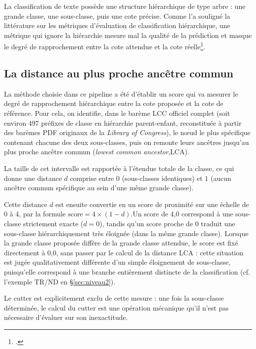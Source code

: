 La classification de texte possède une structure hiérarchique de type arbre : une grande classe, une sous-classe, puis une cote précise. Comme l'a souligné la littérature sur les métriques d'évaluation de classification hiérarchique, une métrique qui ignore la hiérarchie mesure mal la qualité de la prédiction et masque le degré de rapprochement entre la cote attendue et la cote réelle\footcite{kosmopoulos2015,kiritchenko2006}.



\subsection{La distance au plus proche ancêtre commun}
\label{sec:distance-lca}

La méthode choisie dans ce pipeline a été d'établir un score qui va mesurer le degré de rapprochement hiérarchique entre la cote proposée et la cote de référence. Pour cela, on identifie, dans le barème LCC officiel complet (soit environ 497 préfixes de classe en hiérarchie parent-enfant, reconstituée à partir des barèmes PDF originaux de la \textit{Library of Congress}), le nœud le plus spécifique contenant chacune des deux sous-classes, puis on remonte leurs ancêtres jusqu'au plus proche ancêtre commun (\textit{lowest common ancestor},LCA).

La taille de cet intervalle est rapportée à l'étendue totale de la classe, ce qui donne une distance $d$ comprise entre 0 (sous-classes identiques) et 1 (aucun ancêtre commun spécifique au sein d'une même grande classe). 

Cette distance $d$ est ensuite convertie en un score de proximité sur une échelle de 0 à 4, par la formule $\text{score} = 4 \times (1 - d)$.Un score de 4,0 correspond à une sous-classe strictement exacte ($d = 0$), tandis qu'un score proche de 0 traduit une sous-classe hiérarchiquement très éloignée (dans la même grande classe). Lorsque la grande classe proposée diffère de la grande classe attendue, le score est fixé directement à 0,0, sans passer par le calcul de la distance LCA : cette situation est jugée qualitativement différente d'un simple éloignement de sous-classe, puisqu'elle correspond à une branche entièrement distincte de la classification (cf. l'exemple TR/ND en \S\ref{sec:niveau2}).

Le cutter est explicitement exclu de cette mesure : une fois la sous-classe déterminée, le calcul du cutter est une opération mécanique qu'il n'est pas nécessaire d'évaluer sur son inexactitude.




